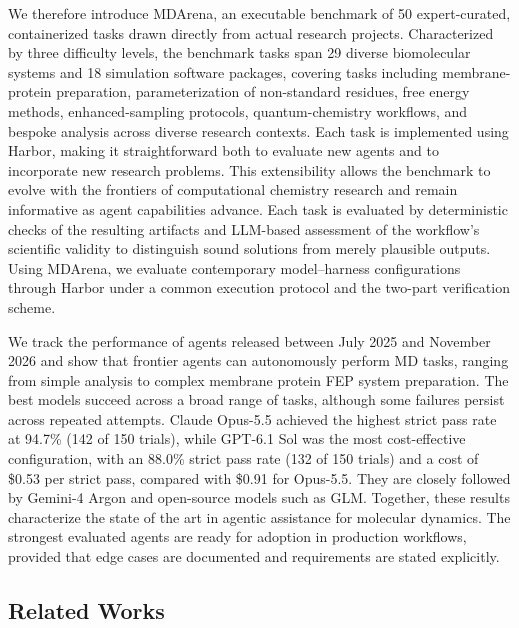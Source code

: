 We therefore introduce MDArena, an executable benchmark of 50 expert-curated, containerized tasks drawn directly from actual research projects. Characterized by three difficulty levels, the benchmark tasks span 29 diverse biomolecular systems and 18 simulation software packages, covering tasks including membrane-protein preparation, parameterization of non-standard residues, free energy methods, enhanced-sampling protocols, quantum-chemistry workflows, and bespoke analysis across diverse research contexts. Each task is implemented using Harbor,\cite{Harbor_Framework} making it straightforward both to evaluate new agents and to incorporate new research problems. This extensibility allows the benchmark to evolve with the frontiers of computational chemistry research and remain informative as agent capabilities advance. Each task is evaluated by deterministic checks of the resulting artifacts and LLM-based assessment of the workflow’s scientific validity to distinguish sound solutions from merely plausible outputs. Using MDArena, we evaluate contemporary model–harness configurations through Harbor\cite{Harbor_Framework} under a common execution protocol and the two-part verification scheme.


We track the performance of agents released between July 2025 and November 2026 and show that frontier agents can autonomously perform MD tasks, ranging from simple analysis to complex membrane protein FEP system preparation. The best models succeed across a broad range of tasks, although some failures persist across repeated attempts. Claude Opus-5.5 achieved the highest strict pass rate at 94.7\% (142 of 150 trials), while GPT-6.1 Sol was the most cost-effective configuration, with an 88.0\% strict pass rate (132 of 150 trials) and a cost of \$0.53 per strict pass, compared with \$0.91 for Opus-5.5. They are closely followed by Gemini-4 Argon and open-source models such as GLM. Together, these results characterize the state of the art in agentic assistance for molecular dynamics. The strongest evaluated agents are ready for adoption in production workflows, provided that edge cases are documented and requirements are stated explicitly.

\subsection{Related Works}

